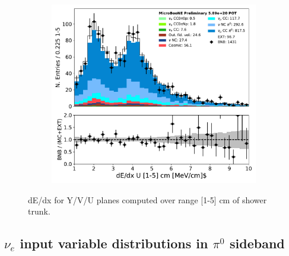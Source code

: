 \begin{figure}[H]
\begin{center}
\begin{subfigure}[b]{0.3\textwidth}
    \caption{}
    \end{subfigure}
    \begin{subfigure}[b]{0.3\textwidth}
    \centering
    \includegraphics[width=1.00\textwidth]{pi0/calorimetry/shr_tkfit_gap10_dedx_U_03112020_ALL_scaled.pdf}
    \caption{}
    \end{subfigure}
\caption{dE/dx for Y/V/U planes computed over range [1-5] cm of shower trunk.}
\label{fig:pi0:calorimetry:dedxgap10}
\end{center}
\end{figure}

\subsection{$\nu_e$ input variable distributions in $\pi^0$ sideband}
\label{app:pi0:nueselection}

